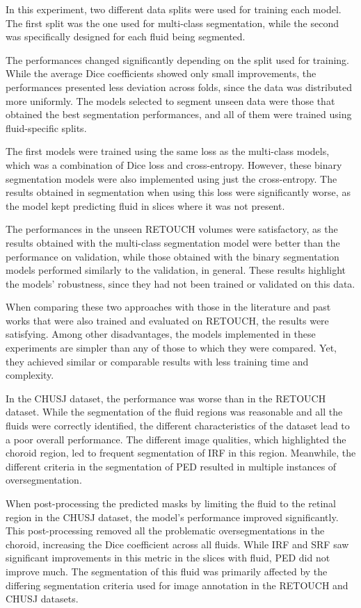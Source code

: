\par
In this experiment, two different data splits were used for training each model. The first split was the one used for multi-class segmentation, while the second was specifically designed for each fluid being segmented.
\par
The performances changed significantly depending on the split used for training. While the average Dice coefficients showed only small improvements, the performances presented less deviation across folds, since the data was distributed more uniformly. The models selected to segment unseen data were those that obtained the best segmentation performances, and all of them were trained using fluid-specific splits.
\par
The first models were trained using the same loss as the multi-class models, which was a combination of Dice loss and cross-entropy. However, these binary segmentation models were also implemented using just the cross-entropy. The results obtained in segmentation when using this loss were significantly worse, as the model kept predicting fluid in slices where it was not present.
\par
The performances in the unseen RETOUCH volumes were satisfactory, as the results obtained with the multi-class segmentation model were better than the performance on validation, while those obtained with the binary segmentation models performed similarly to the validation, in general. These results highlight the models' robustness, since they had not been trained or validated on this data.
\par
When comparing these two approaches with those in the literature and past works that were also trained and evaluated on RETOUCH, the results were satisfying. Among other disadvantages, the models implemented in these experiments are simpler than any of those to which they were compared. Yet, they achieved similar or comparable results with less training time and complexity.
\par
In the CHUSJ dataset, the performance was worse than in the RETOUCH dataset. While the segmentation of the fluid regions was reasonable and all the fluids were correctly identified, the different characteristics of the dataset lead to a poor overall performance. The different image qualities, which highlighted the choroid region, led to frequent segmentation of IRF in this region. Meanwhile, the different criteria in the segmentation of PED resulted in multiple instances of oversegmentation.
\par
When post-processing the predicted masks by limiting the fluid to the retinal region in the CHUSJ dataset, the model's performance improved significantly. This post-processing removed all the problematic oversegmentations in the choroid, increasing the Dice coefficient across all fluids. While IRF and SRF saw significant improvements in this metric in the slices with fluid, PED did not improve much. The segmentation of this fluid was primarily affected by the differing segmentation criteria used for image annotation in the RETOUCH and CHUSJ datasets.

